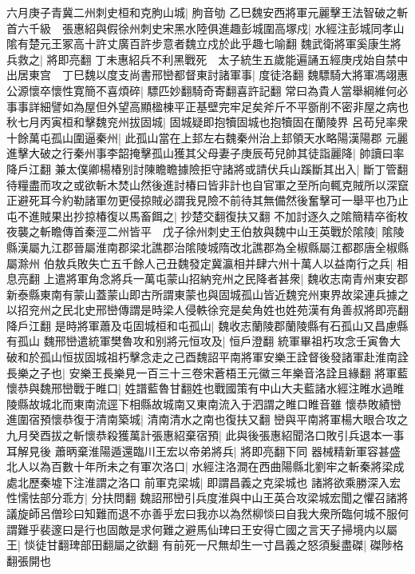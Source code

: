 六月庚子青冀二州刺史桓和克朐山城|{
	胊音劬}
乙巳魏安西將軍元麗擊王法智破之斬首六千級　張惠紹與假徐州刺史宋黑水陸俱進趣彭城圍高塚戍|{
	水經注彭城同孝山隂有楚元王冢高十許丈廣百許步意者魏立戍於此乎趣七喻翻}
魏武衛將軍奚康生將兵救之|{
	將即亮翻}
丁未惠紹兵不利黑戰死　太子統生五歲能遍誦五經庚戌始自禁中出居東宫　丁巳魏以度支尚書邢巒都督東討諸軍事|{
	度徒洛翻}
魏驃騎大將軍馮翊惠公源懷卒懷性寛簡不喜煩碎|{
	驃匹妙翻騎奇寄翻喜許記翻}
常曰為貴人當舉綱維何必事事詳細譬如為屋但外望高顯楹棟平正基壁完牢足矣斧斤不平斵削不密非屋之病也　秋七月丙寅桓和擊魏兖州拔固城|{
	固城疑即抱犢固城也抱犢固在蘭陵界}
呂苟兒率衆十餘萬屯孤山圍逼秦州|{
	此孤山當在上邽左右魏秦州治上邽領天水略陽漢陽郡}
元麗進擊大破之行秦州事李韶掩擊孤山獲其父母妻子庚辰苟兒帥其徒詣麗降|{
	帥讀曰率降戶江翻}
兼太僕卿楊椿别討陳瞻瞻據險拒守諸將或請伏兵山蹊斷其出入|{
	斷丁管翻}
待糧盡而攻之或欲斬木焚山然後進討椿曰皆非計也自官軍之至所向輒克賊所以深竄正避死耳今約勒諸軍勿更侵掠賊必謂我見險不前待其無備然後奮擊可一舉平也乃止屯不進賊果出抄掠椿復以馬畜餌之|{
	抄楚交翻復扶又翻}
不加討逐久之隂簡精卒銜枚夜襲之斬瞻傳首秦涇二州皆平　戊子徐州刺史王伯敖與魏中山王英戰於隂陵|{
	隂陵縣漢屬九江郡晉屬淮南郡梁北譙郡治隂陵城隋改北譙郡為全椒縣屬江都郡唐全椒縣屬滁州}
伯敖兵敗失亡五千餘人己丑魏發定冀瀛相并肆六州十萬人以益南行之兵|{
	相息亮翻}
上遣將軍角念將兵一萬屯蒙山招納兖州之民降者甚衆|{
	魏收志南青州東安郡新泰縣東南有蒙山蓋蒙山即古所謂東蒙也與固城孤山皆近魏兖州東界故梁連兵據之以招兖州之民北史邢巒傳謂是時梁人侵軼徐兖是矣角姓也姓苑漢有角善叔將即亮翻降戶江翻}
是時將軍蕭及屯固城桓和屯孤山|{
	魏收志蘭陵郡蘭陵縣有石孤山又昌慮縣有孤山}
魏邢巒遣統軍樊魯攻和别將元恒攻及|{
	恒戶澄翻}
統軍畢祖朽攻念壬寅魯大破和於孤山恒拔固城祖朽擊念走之己酉魏詔平南將軍安樂王詮督後發諸軍赴淮南詮長樂之子也|{
	安樂王長樂見一百三十三卷宋蒼梧王元徽三年樂音洛詮且緣翻}
將軍藍懷恭與魏邢巒戰于睢口|{
	姓譜藍魯甘翻姓也戰國策有中山大夫藍諸水經注睢水過睢陵縣故城北而東南流逕下相縣故城南又東南流入于泗謂之睢口睢音雖}
懷恭敗績巒進圍宿預懷恭復于清南築城|{
	清南清水之南也復扶又翻}
巒與平南將軍楊大眼合攻之九月癸酉拔之斬懷恭殺獲萬計張惠紹棄宿預|{
	此與後張惠紹聞洛口敗引兵退本一事耳解見後}
蕭昞棄淮陽遁還臨川王宏以帝弟將兵|{
	將即亮翻下同}
器械精新軍容甚盛北人以為百數十年所未之有軍次洛口|{
	水經注洛澗在西曲陽縣北劉牢之斬秦將梁成處北歷秦墟下注淮謂之洛口}
前軍克梁城|{
	即謂昌義之克梁城也}
諸將欲乘勝深入宏性懦怯部分乖方|{
	分扶問翻}
魏詔邢巒引兵度淮與中山王英合攻梁城宏聞之懼召諸將議旋師呂僧珍曰知難而退不亦善乎宏曰我亦以為然柳惔曰自我大衆所臨何城不服何謂難乎裴邃曰是行也固敵是求何難之避馬仙琕曰王安得亡國之言天子掃境内以屬王|{
	惔徒甘翻琕部田翻屬之欲翻}
有前死一尺無却生一寸昌義之怒須髮盡磔|{
	磔陟格翻張開也}
